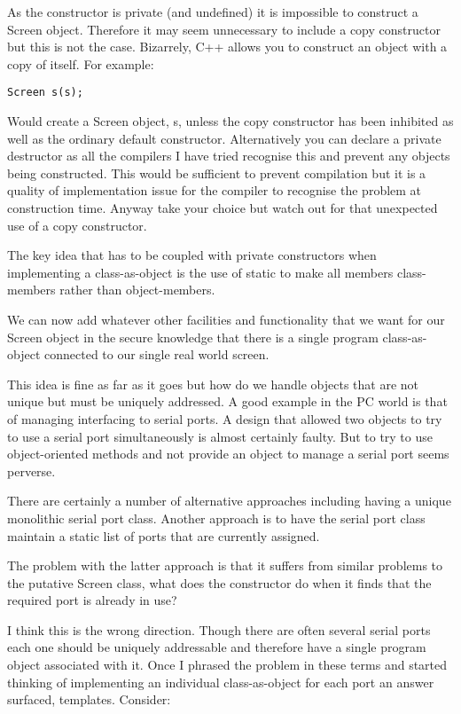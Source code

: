 \documentclass{book}
\begin{document}
As the constructor is private (and undefined) it is impossible to construct a Screen object. Therefore it may seem unnecessary to include a copy constructor but this is not the case. Bizarrely, C++ allows you to construct an object with a copy of itself. For example:

\begin{lstlisting}
Screen s(s);
\end{lstlisting}

Would create a Screen object, s, unless the copy constructor has been inhibited as well as the ordinary default constructor.
Alternatively you can declare a private destructor as all the compilers I have tried recognise this and prevent any objects being constructed. 
This would be sufficient to prevent compilation but it is a quality of implementation issue for the compiler to recognise the problem at construction time. 
Anyway take your choice but watch out for that unexpected use of a copy constructor.

The key idea that has to be coupled with private constructors when implementing a class-as-object is the use of static to make all members class-members rather than object-members.

We can now add whatever other facilities and functionality that we want for our Screen object in the secure knowledge that there is a single program class-as-object connected to our single real world screen.

This idea is fine as far as it goes but how do we handle objects that are not unique but must be uniquely addressed. 
A good example in the PC world is that of managing interfacing to serial ports. 
A design that allowed two objects to try to use a serial port simultaneously is almost certainly faulty.
But to try to use object-oriented methods and not provide an object to manage a serial port seems perverse.

There are certainly a number of alternative approaches including having a unique monolithic serial port class. 
Another approach is to have the serial port class maintain a static list of ports that are currently assigned.

The problem with the latter approach is that it suffers from similar problems to the putative Screen class, what does the constructor do when it finds that the required port is already in use?

I think this is the wrong direction. Though there are often several serial ports each one should be uniquely addressable and therefore have a single program object associated with it.
Once I phrased the problem in these terms and started thinking of implementing an individual class-as-object for each port an answer surfaced, templates. 
Consider:
\end{document}
